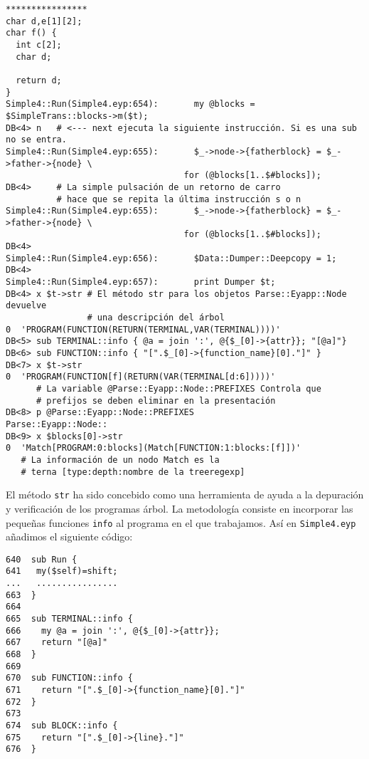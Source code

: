 \begin{verbatim}
****************
char d,e[1][2];
char f() {
  int c[2];
  char d;

  return d;
}
Simple4::Run(Simple4.eyp:654):       my @blocks = $SimpleTrans::blocks->m($t);
DB<4> n   # <--- next ejecuta la siguiente instrucción. Si es una sub no se entra.
Simple4::Run(Simple4.eyp:655):       $_->node->{fatherblock} = $_->father->{node} \
                                   for (@blocks[1..$#blocks]);
DB<4>     # La simple pulsación de un retorno de carro 
          # hace que se repita la última instrucción s o n
Simple4::Run(Simple4.eyp:655):       $_->node->{fatherblock} = $_->father->{node} \
                                   for (@blocks[1..$#blocks]);
DB<4>
Simple4::Run(Simple4.eyp:656):       $Data::Dumper::Deepcopy = 1;
DB<4>
Simple4::Run(Simple4.eyp:657):       print Dumper $t;
DB<4> x $t->str # El método str para los objetos Parse::Eyapp::Node devuelve 
                # una descripción del árbol
0  'PROGRAM(FUNCTION(RETURN(TERMINAL,VAR(TERMINAL))))'
DB<5> sub TERMINAL::info { @a = join ':', @{$_[0]->{attr}}; "[@a]"}
DB<6> sub FUNCTION::info { "[".$_[0]->{function_name}[0]."]" }
DB<7> x $t->str
0  'PROGRAM(FUNCTION[f](RETURN(VAR(TERMINAL[d:6]))))'
      # La variable @Parse::Eyapp::Node::PREFIXES Controla que 
      # prefijos se deben eliminar en la presentación
DB<8> p @Parse::Eyapp::Node::PREFIXES 
Parse::Eyapp::Node::
DB<9> x $blocks[0]->str
0  'Match[PROGRAM:0:blocks](Match[FUNCTION:1:blocks:[f]])' 
   # La información de un nodo Match es la 
   # terna [type:depth:nombre de la treeregexp]
\end{verbatim}




El método \verb|str| ha sido concebido como una herramienta de
ayuda a la depuración y verificación de los programas árbol.
La metodología consiste en incorporar las pequeñas funciones
\verb|info| al programa en el que trabajamos. Así en \verb|Simple4.eyp|
añadimos el siguiente código:

\begin{verbatim}
640  sub Run {
641   my($self)=shift;
...   ................
663  }
664
665  sub TERMINAL::info {
666    my @a = join ':', @{$_[0]->{attr}};
667    return "[@a]"
668  }
669
670  sub FUNCTION::info {
671    return "[".$_[0]->{function_name}[0]."]"
672  }
673
674  sub BLOCK::info {
675    return "[".$_[0]->{line}."]"
676  }
\end{verbatim}



